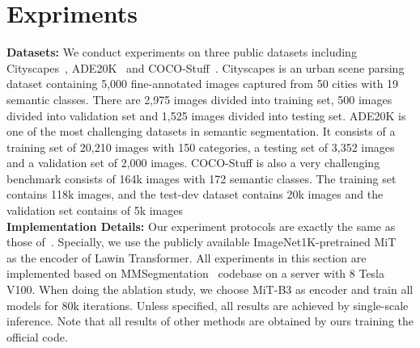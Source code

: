 \documentclass[10pt,twocolumn,letterpaper]{article}
\begin{document}
\section{Expriments}
\medskip
\noindent
\textbf{Datasets:}
We conduct experiments on three public datasets including Cityscapes~\cite{cordts2016cityscapes}, ADE20K~\cite{zhou2017scene} and COCO-Stuff~\cite{caesar2018coco}. Cityscapes is an urban scene parsing dataset containing 5,000 fine-annotated images captured from 50 cities with 19 semantic classes. There are 2,975 images divided into training set, 500 images divided into validation set and 1,525 images divided into testing set. ADE20K is one of the most challenging datasets in semantic segmentation. It consists of a training set of 20,210 images with 150 categories, a testing set of 3,352 images and a validation set of 2,000 images. COCO-Stuff is also a very challenging benchmark consists of 164k images with 172 semantic classes. The training set contains 118k images, and the test-dev dataset contains 20k images and the validation set contains of 5k images
\medskip\\
\textbf{Implementation Details:}
Our experiment protocols are exactly the same as those of~\cite{xie2021segformer}. Specially, we use the publicly available ImageNet1K-pretrained MiT~\cite{xie2021segformer} as the encoder of Lawin Transformer. All experiments in this section are implemented based on MMSegmentation~\cite{mmseg2020} codebase on a server with 8 Tesla V100. When doing the ablation study, we choose MiT-B3 as encoder and train all models for 80k iterations. Unless specified, all results are achieved by single-scale inference. Note that all results of other methods are obtained by ours training the official code.
\end{document}
